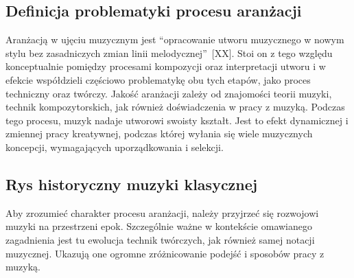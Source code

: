 \documentclass[12pt]{article}
\begin{document}
\subsection{Definicja problematyki procesu aranżacji}
Aranżacją w ujęciu muzycznym jest
\enquote{opracowanie utworu muzycznego w nowym stylu bez zasadniczych zmian linii melodycznej}~[XX].
Stoi on z tego względu konceptualnie pomiędzy procesami kompozycji oraz interpretacji utworu
i w efekcie współdzieli częściowo problematykę obu tych etapów, jako proces techniczny oraz twórczy.
Jakość aranżacji zależy od znajomości teorii muzyki, technik kompozytorskich, jak również doświadczenia w pracy z muzyką.
Podczas tego procesu, muzyk nadaje utworowi swoisty kształt. Jest to efekt dynamicznej i zmiennej pracy kreatywnej, podczas
której wyłania się wiele muzycznych koncepcji, wymagających uporządkowania i selekcji.

\subsection{Rys historyczny muzyki klasycznej}
Aby zrozumieć charakter procesu aranżacji, należy przyjrzeć się rozwojowi muzyki na przestrzeni epok.
Szczególnie ważne w kontekście omawianego zagadnienia jest tu ewolucja technik twórczych, jak również samej
notacji muzycznej. Ukazują one ogromne zróżnicowanie podejść i sposobów pracy z muzyką.
\end{document}
